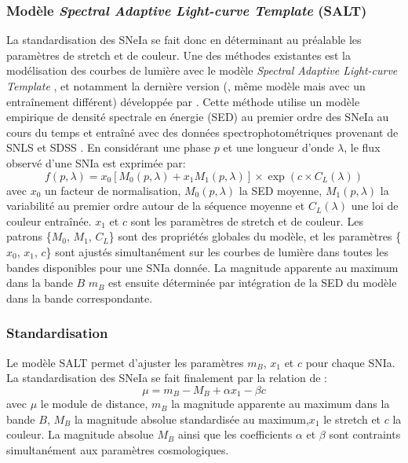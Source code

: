 \documentclass[../main/main.tex]{subfiles}
\begin{document}
\subsubsection{Modèle \textit{Spectral Adaptive Light-curve Template} (SALT)}

La standardisation des SNeIa se fait donc en déterminant au préalable
les paramètres de stretch et de couleur. Une des méthodes existantes est
la modélisation des courbes de lumière avec le modèle \textit{Spectral
  Adaptive Light-curve Template}
\citep[SALT,][]{Guysalt2005,Guysalt22007}, et notamment la dernière
version (, même modèle mais avec un entraînement différent) développée par \citet{Betoule2014}. 
Cette méthode utilise un modèle empirique de densité spectrale en
énergie (SED) au premier ordre des SNeIa au cours du temps et entraîné avec des données spectrophotométriques provenant de
SNLS et SDSS \citep{Betoule2014}. En considérant une phase $p$ et une longueur d'onde
$\lambda$, le flux observé d'une SNIa est exprimée par:
\begin{equation}
  \label{eq:saltflux}
  f(p,\lambda)=x_{0}\left[M_{0}(p,\lambda)+x_{1}M_{1}(p,\lambda)\right]\times\exp\left(c\times
    C_{L}(\lambda)\right)
\end{equation}
avec $x_{0}$ un facteur de normalisation, $M_{0}(p,\lambda)$ la SED
moyenne, $M_{1}(p,\lambda)$ la variabilité au premier ordre autour de la
séquence moyenne et $C_{L}(\lambda)$ une loi de couleur
entraînée. $x_{1}$ et $c$ sont les paramètres de stretch et de couleur.
Les patrons \{$M_{0}$, $M_{1}$, $C_{L}$\} sont des propriétés
globales du modèle, et les paramètres \{$x_{0}$, $x_{1}$, $c$\} sont
ajustés simultanément sur les courbes de lumière dans toutes les bandes
disponibles pour une SNIa donnée. La magnitude apparente au maximum dans la bande
$B$ $m_{B}$ est ensuite déterminée par intégration de la SED du modèle
dans la bande correspondante.

\subsubsection{Standardisation}

Le modèle SALT permet d'ajuster les paramètres $m_{B}$, $x_{1}$ et
$c$ pour chaque SNIa. 
La standardisation des SNeIa se fait finalement par la relation de \citet{Tripp1998}:
\begin{equation}
  \label{eq:mustandard}
  \mu  = m_{B}- M_{B}+\alpha x_{1}-\beta c
\end{equation}
avec $\mu$ le module de distance, $m_{B}$ la magnitude apparente
au maximum dans la
bande $B$, $M_{B}$ la magnitude absolue standardisée au maximum,$x_{1}$
le stretch et $c$ la couleur. La magnitude absolue $M_{B}$ ainsi que les coefficients $\alpha$ et $\beta$ sont
contraints simultanément aux paramètres cosmologiques.
\end{document}
